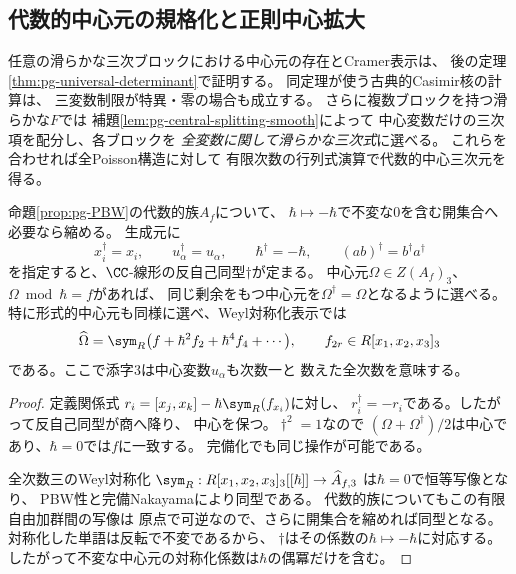 \subsection{代数的中心元の規格化と正則中心拡大}
任意の滑らかな三次ブロックにおける中心元の存在とCramer表示は、
後の定理\ref{thm:pg-universal-determinant}で証明する。
同定理が使う古典的Casimir核の計算は、
三変数制限が特異・零の場合も成立する。
さらに複数ブロックを持つ滑らかな$F$では
補題\ref{lem:pg-central-splitting-smooth}によって
中心変数だけの三次項を配分し、各ブロックを
\emph{全変数に関して滑らかな三次式}に選べる。
これらを合わせれば全Poisson構造に対して
有限次数の行列式演算で代数的中心三次元を得る。

\begin{lemma}[中心三次元の偶性]\label{lem:pg-center-parity}
命題\ref{prop:pg-PBW}の代数的族$A_f$について、
$\hbar\mapsto-\hbar$で不変な$0$を含む開集合へ必要なら縮める。
生成元に
\begin{equation}
 x_i^\dagger=x_i,\qquad u_\alpha^\dagger=u_\alpha,\qquad
 \hbar^\dagger=-\hbar,\qquad(ab)^\dagger=b^\dagger a^\dagger
\end{equation}
を指定すると、$\CC$-線形の反自己同型$\dagger$が定まる。
中心元$\Omega\in Z(A_f)_3$、$\Omega\bmod\hbar=f$があれば、
同じ剰余をもつ中心元を$\Omega^\dagger=\Omega$となるように選べる。
特に形式的中心元も同様に選べ、Weyl対称化表示では
\begin{equation}
 \widehat\Omega
 =\sym_R\bigl(f+\hbar^2 f_2+\hbar^4 f_4+\cdots\bigr),
 \qquad f_{2r}\in R[x_1,x_2,x_3]_3
\end{equation}
である。ここで添字$3$は中心変数$u_\alpha$も次数一と
数えた全次数を意味する。
\end{lemma}
\begin{proof}
定義関係式
$r_i=[x_j,x_k]-\hbar\sym_R(f_{x_i})$に対し、
$r_i^\dagger=-r_i$である。したがって反自己同型が商へ降り、
中心を保つ。$\dagger^2=1$なので
$(\Omega+\Omega^\dagger)/2$は中心であり、$\hbar=0$では$f$に一致する。
完備化でも同じ操作が可能である。

全次数三のWeyl対称化
$\sym_R:R[x_1,x_2,x_3]_3[[\hbar]]\to\widehat A_{f,3}$
は$\hbar=0$で恒等写像となり、
PBW性と完備Nakayamaにより同型である。
代数的族についてもこの有限自由加群間の写像は
原点で可逆なので、さらに開集合を縮めれば同型となる。
対称化した単語は反転で不変であるから、
$\dagger$はその係数の$\hbar\mapsto-\hbar$に対応する。
したがって不変な中心元の対称化係数は$\hbar$の偶冪だけを含む。
\end{proof}

